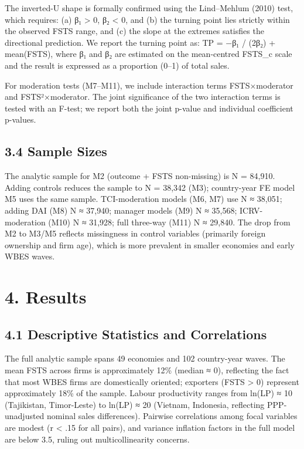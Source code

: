 \documentclass[
  12pt]{article}
\begin{document}
The inverted-U shape is formally confirmed using the Lind--Mehlum (2010)
test, which requires: (a) β₁ \textgreater{} 0, β₂ \textless{} 0, and (b)
the turning point lies strictly within the observed FSTS range, and (c)
the slope at the extremes satisfies the directional prediction. We
report the turning point as: TP = −β₁ / (2β₂) + mean(FSTS), where β₁ and
β₂ are estimated on the mean-centred FSTS\_c scale and the result is
expressed as a proportion (0--1) of total sales.

For moderation tests (M7--M11), we include interaction terms
FSTS×moderator and FSTS²×moderator. The joint significance of the two
interaction terms is tested with an F-test; we report both the joint
p-value and individual coefficient p-values.

\hypertarget{sample-sizes}{%
\subsection{3.4 Sample Sizes}\label{sample-sizes}}

The analytic sample for M2 (outcome + FSTS non-missing) is N = 84,910.
Adding controls reduces the sample to N = 38,342 (M3); country-year FE
model M5 uses the same sample. TCI-moderation models (M6, M7) use N ≈
38,051; adding DAI (M8) N ≈ 37,940; manager models (M9) N ≈ 35,568;
ICRV-moderation (M10) N ≈ 31,928; full three-way (M11) N ≈ 29,840. The
drop from M2 to M3/M5 reflects missingness in control variables
(primarily foreign ownership and firm age), which is more prevalent in
smaller economies and early WBES waves.

\hypertarget{results}{%
\section{4. Results}\label{results}}

\hypertarget{descriptive-statistics-and-correlations}{%
\subsection{4.1 Descriptive Statistics and
Correlations}\label{descriptive-statistics-and-correlations}}

The full analytic sample spans 49 economies and 102 country-year waves.
The mean FSTS across firms is approximately 12\% (median ≈ 0),
reflecting the fact that most WBES firms are domestically oriented;
exporters (FSTS \textgreater{} 0) represent approximately 18\% of the
sample. Labour productivity ranges from ln(LP) ≈ 10 (Tajikistan,
Timor-Leste) to ln(LP) ≈ 20 (Vietnam, Indonesia, reflecting
PPP-unadjusted nominal sales differences). Pairwise correlations among
focal variables are modest (\textbar r\textbar{} \textless{} .15 for all
pairs), and variance inflation factors in the full model are below 3.5,
ruling out multicollinearity concerns.
\end{document}
